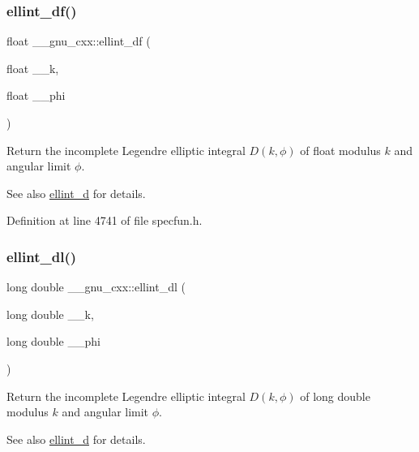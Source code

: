 \subsubsection{\texorpdfstring{ellint\+\_\+df()}{ellint\_df()}}
{\footnotesize\ttfamily float \+\_\+\+\_\+gnu\+\_\+cxx\+::ellint\+\_\+df (\begin{DoxyParamCaption}\item[{float}]{\+\_\+\+\_\+k,  }\item[{float}]{\+\_\+\+\_\+phi }\end{DoxyParamCaption})\hspace{0.3cm}{\ttfamily [inline]}}

Return the incomplete Legendre elliptic integral $ D(k, \phi) $ of {\ttfamily float} modulus $ k $ and angular limit $ \phi $.

\begin{DoxySeeAlso}{See also}
\hyperlink{group__gnu__math__spec__func_gad75103894786e6d7766bac4d8447b6cc}{ellint\+\_\+d} for details. 
\end{DoxySeeAlso}


Definition at line 4741 of file specfun.\+h.

\mbox{\label{group__gnu__math__spec__func_gaa34bcb8e316f2e8b2b2bf48cd89abd98}} 
\subsubsection{\texorpdfstring{ellint\+\_\+dl()}{ellint\_dl()}}
{\footnotesize\ttfamily long double \+\_\+\+\_\+gnu\+\_\+cxx\+::ellint\+\_\+dl (\begin{DoxyParamCaption}\item[{long double}]{\+\_\+\+\_\+k,  }\item[{long double}]{\+\_\+\+\_\+phi }\end{DoxyParamCaption})\hspace{0.3cm}{\ttfamily [inline]}}

Return the incomplete Legendre elliptic integral $ D(k, \phi) $ of {\ttfamily long double} modulus $ k $ and angular limit $ \phi $.

\begin{DoxySeeAlso}{See also}
\hyperlink{group__gnu__math__spec__func_gad75103894786e6d7766bac4d8447b6cc}{ellint\+\_\+d} for details. 
\end{DoxySeeAlso}


